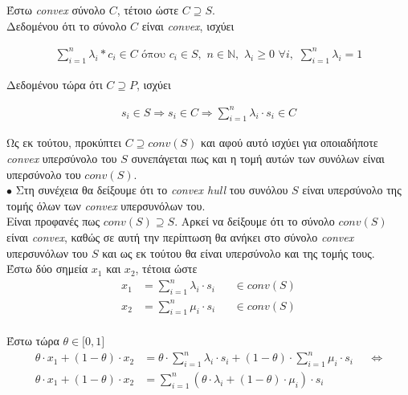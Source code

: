 \documentclass[12pt]{article}
\newcommand{\N}{\mathbb{N}}
\newcommand{\margin}{\hspace{4pt}}
\begin{document}
Έστω \textit{convex} σύνολο $C$, τέτοιο ώστε $C \supseteq S$.\\

Δεδομένου ότι το σύνολο $C$ είναι \textit{convex}, ισχύει

\begin{align*}
    \sum_{i = 1}^{n} λ_i * c_i \in C \text{ όπου }
    c_i \in S, \margin
    n \in \N, \margin
    λ_i \geq 0 \margin \forall i, \margin
    \sum_{i = 1}^{n} λ_i = 1
\end{align*}

Δεδομένου τώρα ότι $C \supseteq P$, ισχύει

\begin{align*}
    s_i \in S \Rightarrow s_i \in C \Rightarrow \sum_{i = 1}^{n} λ_i \cdot s_i \in C
\end{align*}

Ως εκ τούτου, προκύπτει $C \supseteq conv(S)$ και αφού αυτό ισχύει για οποιαδήποτε \textit{convex}
υπερσύνολο του $S$ συνεπάγεται πως και η τομή αυτών των συνόλων είναι υπερσύνολο του $conv(S)$.\\

$\bullet$ Στη συνέχεια θα δείξουμε ότι το \textit{convex hull} του συνόλου $S$ είναι υπερσύνολο της
τομής όλων των \textit{convex} υπερσυνόλων του.\\

Είναι προφανές πως $conv(S) \supseteq S$. Αρκεί να δείξουμε ότι το σύνολο $conv(S)$
είναι \textit{convex}, καθώς σε αυτή την περίπτωση θα ανήκει στο σύνολο \textit{convex} υπερσυνόλων του
$S$ και ως εκ τούτου θα είναι υπερσύνολο και της τομής τους.\\

Έστω δύο σημεία $x_1$ και $x_2$, τέτοια ώστε\\

\begin{align*}
    x_1 & = \sum_{i = 1}^{n} λ_i \cdot s_i && \in conv(S) \\
    x_2 & = \sum_{i = 1}^{n} μ_i \cdot s_i && \in conv(S)
\end{align*}\\

Έστω τώρα $\theta \in \lbrack 0, 1 \rbrack$\\

\begin{align*}
    \theta \cdot x_1 + (1 - \theta) \cdot x_2 & = \theta \cdot \sum_{i = 1}^{n} λ_i \cdot s_i + (1 - \theta) \cdot \sum_{i = 1}^{n} μ_i \cdot s_i && \Leftrightarrow \\
    \theta \cdot x_1 + (1 - \theta) \cdot x_2 & = \sum_{i = 1}^{n}(\theta \cdot λ_i + (1 - \theta) \cdot μ_i) \cdot s_i
\end{align*}\\
\end{document}
